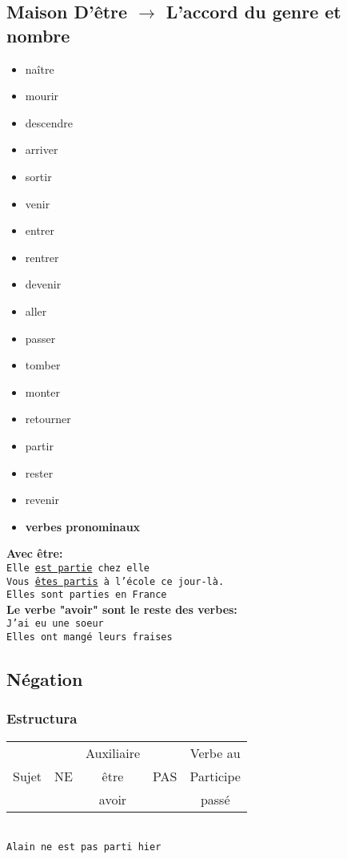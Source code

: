 \documentclass[letterpaper,12pt]{article}
\begin{document}
\begin{sloppypar}
\subsection{Maison D'être $\longrightarrow$ L'accord du genre et nombre}
\begin{itemize}
    \item naître
    \item mourir
    \item descendre
    \item arriver
    \item sortir
    \item venir
    \item entrer
    \item rentrer
    \item devenir
    \item aller 
    \item passer
    \item tomber
    \item monter
    \item retourner
    \item partir
    \item rester
    \item revenir
    \item \textbf{verbes pronominaux}
\end{itemize}
\textbf{Avec être:}\\ 
\texttt{Elle \underline{est partie} chez elle \\ Vous \underline{êtes partis} à l'école ce jour-là. \\ Elles sont parties en France}
\vspace{0.3cm}\\ 
\textbf{Le verbe "avoir" sont le reste des verbes:} \\ 
\texttt{J'ai eu une soeur \\ Elles ont mangé leurs fraises}

\subsection{Négation}
\subsubsection{Estructura}
\begin{center}
    \begin{tabular}{|c|c|c|c|c|} \hline
                &    & Auxiliaire &  & Verbe au \\
        Sujet& NE &  être &  PAS & Participe \\ 
                &    &  avoir &     & passé \\  
        \hline
    \end{tabular}
    \vspace{0.3cm}\\ 
    \texttt{Alain ne est pas parti hier}
\end{center}

\end{sloppypar}
\end{document}
